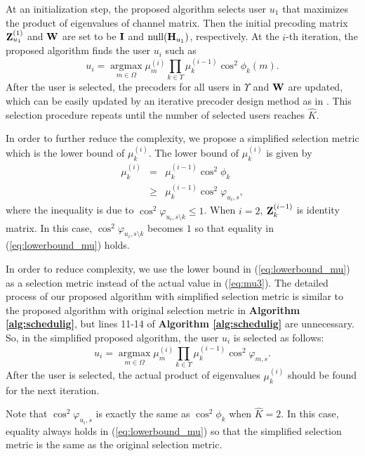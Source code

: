 \documentclass[journal,twoside]{IEEEtranTCOM}
\begin{document}
At an initialization step, the proposed algorithm selects user $u_1$ that maximizes the product of eigenvalues of channel matrix. Then the  initial precoding matrix ${\bf{Z}}_{u_1}^{(1)}$ and $\bf{W}$ are set to be $\bf{I}$ and $\mathrm{null}({{\bf{H}}_{{u_1}}})$, respectively. At the $i$-th iteration, the proposed algorithm finds the user $u_i$ such as
\begin{equation}
{u_i}  =  \mathop {\arg \max }\limits_{m \in \Omega } \mu_m^{(i)} \prod\limits_{k \in \Upsilon} {\mu_k^{(i-1)}} {\cos^2{\phi}_k(m)}.
\end{equation}
After the user is selected, the precoders for all users in $\Upsilon$ and $\bf{W}$ are updated, which can be easily updated by an iterative precoder design method as in \cite{SRN}. This selection procedure repeats until the number of selected users reaches $\hat{K}$.

In order to further reduce the complexity, we propose a simplified selection metric which is the lower bound of $\mu _k^{(i)}$. The lower bound of $\mu _k^{(i)}$ is given by
\begin{eqnarray}
{{\mu} _{k}^{(i)}} & = & \mu _{k}^{(i-1)} {\cos^2{\phi}_k} \nonumber \\
& \geq & \mu _{k}^{(i-1)} {\cos^2 \varphi_{{u_i}, s}}, \label{eq:lowerbound_mu}
\end{eqnarray}
where the inequality is due to ${\cos^2 \varphi_{{u_i}, s \setminus k }} \leq 1$. When $i=2$, ${\bf{Z}}_k^{(i-1)}$ is identity matrix. In this case, ${\cos^2 \varphi_{{u_i}, s \setminus k }}$ becomes $1$ so that equality in (\ref{eq:lowerbound_mu}) holds.

In order to reduce complexity, we use the lower bound in (\ref{eq:lowerbound_mu}) as a selection metric instead of the actual value in (\ref{eq:mu3}). The detailed process of our proposed algorithm with simplified selection metric is similar to the proposed algorithm with original selection metric in \textbf{Algorithm \ref{alg:schedulig}}, but lines 11-14 of \textbf{Algorithm \ref{alg:schedulig}} are unnecessary. So, in the simplified proposed algorithm, the user $u_i$ is selected as follows:
\begin{equation}
{u_i}  =  \mathop {\arg \max }\limits_{m \in \Omega } \mu_m^{(i)} \prod\limits_{k \in \Upsilon} {\mu_k^{(i-1)}} {\cos^2 \varphi_{{m}, s}}.
\end{equation}
After the user is selected, the actual product of eigenvalues ${\mu}_k^{(i)}$ should be found for the next iteration.

Note that $\cos^2 \varphi_{{u_i}, s}$ is exactly the same as ${\cos^2{\phi}_k}$ when $\hat{K}=2$. In this case, equality always holds in (\ref{eq:lowerbound_mu}) so that the simplified selection metric is the same as the original selection metric.
\end{document}
